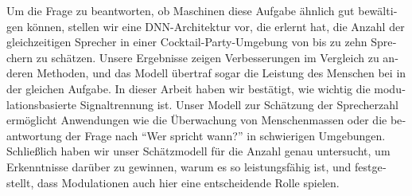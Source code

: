 \begin{otherlanguage}{ngerman}
Um die Frage zu beantworten, ob Maschinen diese Aufgabe ähnlich gut bewältigen können, stellen wir eine DNN-Architektur vor, die erlernt hat, die Anzahl der gleichzeitigen Sprecher in einer Cocktail-Party-Umgebung von bis zu zehn Sprechern zu schätzen.
Unsere Ergebnisse zeigen Verbesserungen im Vergleich zu anderen Methoden, und das Modell übertraf sogar die Leistung des Menschen bei in der gleichen Aufgabe.
In dieser Arbeit haben wir bestätigt, wie wichtig die modulationsbasierte Signaltrennung ist. 
Unser Modell zur Schätzung der Sprecherzahl ermöglicht Anwendungen wie die Überwachung von Menschenmassen oder die beantwortung der Frage nach ``Wer spricht wann?'' in schwierigen Umgebungen.
Schließlich haben wir unser Schätzmodell für die Anzahl genau untersucht, um Erkenntnisse darüber zu gewinnen, warum es so leistungsfähig ist, und festgestellt, dass Modulationen auch hier eine entscheidende Rolle spielen.
\end{otherlanguage}

\endgroup

\vfill
